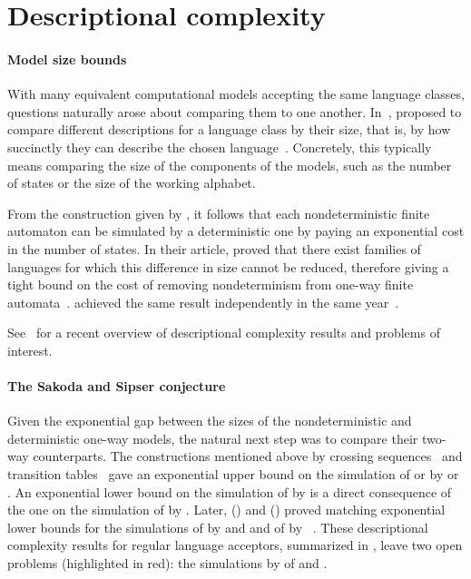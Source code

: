 \section{Descriptional complexity}\label{sec:context-descrcomp}

\paragraph{Model size bounds} With many equivalent computational models accepting the same language classes, questions naturally arose about comparing them to one another.
In~\citeyear{MeyFis71}, \citeauthor{MeyFis71} proposed to compare different descriptions for a language class by their size, that is, by how succinctly they can describe the chosen language~\cite{MeyFis71}.
Concretely, this typically means comparing the size of the components of the models, such as the number of states or the size of the working alphabet.

From the construction given by \citeauthor{RabSco59}, it follows that each nondeterministic finite automaton can be simulated by a deterministic one by paying an exponential cost in the number of states.
In their article, \citeauthor{MeyFis71} proved that there exist families of languages for which this difference in size cannot be reduced, therefore giving a tight bound on the cost of removing nondeterminism from one-way finite automata~\cite{MeyFis71}.
\citeauthor{Moo71} achieved the same result independently in the same year~\cite{Moo71}.

See~\cite{KutMor+21} for a recent overview of descriptional complexity results and problems of interest.

\paragraph{The Sakoda and Sipser conjecture} Given the exponential gap between the sizes of the nondeterministic and deterministic one-way models, the natural next step was to compare their two-way counterparts.
The constructions mentioned above by crossing sequences~\cite{RabSco59} and transition tables~\cite{She59} gave an exponential upper bound on the simulation of \TNFAs or \TDFAs by \ONFAs or \ODFAs.
An exponential lower bound on the simulation of \TNFAs by \ODFAs is a direct consequence of the one on the simulation of \ONFAs by \ODFAs.
Later, \citeauthor{Bir93} (\citeyear{Bir93}) and \citeauthor{Kap05} (\citeyear{Kap05}) proved matching exponential lower bounds for the simulations of \TDFAs by \ONFAs and \ODFAs and of \TNFAs by \ONFAs~\cite{Bir93,Kap05}.
These descriptional complexity results for regular language acceptors, summarized in , leave two open problems (highlighted in red): the simulations by \TDFAs of \TNFAs and \ONFAs.

